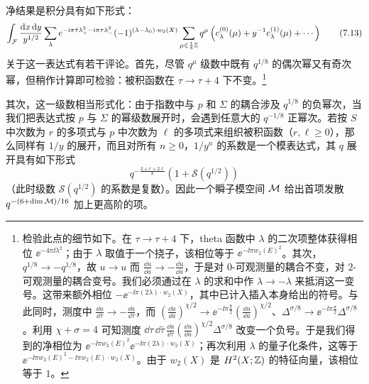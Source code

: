\begin{enumerate}
净结果是积分具有如下形式：
\begin{equation}
\int_{\mathcal{F}}\frac{\mathrm{d} x\,\mathrm{d} y}{y^{1/2}}
\sum_{\lambda}
e^{-\mathrm{i}\pi\bar\tau\lambda_+^{2}-\mathrm{i}\pi\tau\lambda_-^{2}}
(-1)^{(\lambda-\lambda_0)\cdot w_2(X)}
\sum_{\mu\in\frac{1}{8}\mathbb{Z}}
q^{\mu}\left(c_{\lambda}^{(0)}(\mu)+y^{-1}c_{\lambda}^{(1)}(\mu)+\cdots\right)
\tag{7.13}
\end{equation}
关于这一表达式有若干评论。首先，尽管 $q^{\mu}$ 级数中既有 $q^{1/8}$ 的偶次幂又有奇次幂，但稍作计算即可检验：被积函数在 $\tau\to\tau+4$ 下不变。\footnote{检验此点的细节如下。在 $\tau\to\tau+4$ 下，theta 函数中 $\lambda$ 的二次项整体获得相位 $\ee^{-4\pi\ii\lambda^{2}}$；由于 $\lambda$ 取值于一个挠子，该相位等于 $\ee^{-\ii\pi w_2(E)^{2}}$。其次，$q^{1/8}\to-q^{1/8}$，故 $u\to u$ 而 $\frac{\dd u}{\dd a}\to-\frac{\dd u}{\dd a}$，于是对 $0$-可观测量的耦合不变，对 $2$-可观测量的耦合变号。我们必须通过在 $\lambda$ 的求和中作 $\lambda\to-\lambda$ 来抵消这一变号。这带来额外相位 $-\ee^{-\ii\pi(2\lambda)\cdot w_2(X)}$，其中已计入插入本身给出的符号。与此同时，测度中 $\frac{\dd a}{\dd\tau}\to-\frac{\dd a}{\dd\tau}$，而 $\left(\frac{\dd u}{\dd a}\right)^{\chi/2}\to\ee^{-\ii\pi\frac{\chi}{2}}\left(\frac{\dd u}{\dd a}\right)^{\chi/2}$、$\Delta^{\sigma/8}\to\ee^{-\ii\pi\frac{\sigma}{2}}\Delta^{\sigma/8}$。利用 $\chi+\sigma=4$ 可知测度 $\dd\tau\,\dd\bar\tau\,\frac{\dd a}{\dd\tau}\left(\frac{\dd u}{\dd a}\right)^{\chi/2}\Delta^{\sigma/8}$ 改变一个负号。于是我们得到的净相位为 $\ee^{-\ii\pi w_2(E)^{2}}\ee^{-\ii\pi(2\lambda)\cdot w_2(X)}$；再次利用 $\lambda$ 的量子化条件，这等于 $\ee^{-\ii\pi w_2(E)^{2}-\ii\pi w_2(E)\cdot w_2(X)}$。由于 $w_2(X)$ 是 $H^{2}(X;\mathbb{Z})$ 的特征向量，该相位等于 $1$。}

其次，这一级数相当形式化：由于指数中与 $p$ 和 $\Sigma$ 的耦合涉及 $q^{1/8}$ 的负幂次，当我们把表达式按 $p$ 与 $\Sigma$ 的幂级数展开时，会遇到任意大的 $q^{-1/8}$ 正幂次。若按 $S$ 中次数为 $r$ 的多项式与 $p$ 中次数为 $\ell$ 的多项式来组织被积函数（$r,\ell\ge0$），那么同样有 $1/y$ 的展开，而且对所有 $n\ge0$，$1/y^{n}$ 的系数是一个模表达式，其 $q$ 展开具有如下形式
\begin{equation}
q^{-\frac{3+r+2\ell}{8}}\left(1+\mathcal{S}(q^{1/2})\right)
\tag{7.14}
\end{equation}
（此时级数 $\mathcal{S}(q^{1/2})$ 的系数是复数）。因此一个瞬子模空间 $\mathcal{M}$ 给出首项发散 $q^{-(6+\dim\mathcal{M})/16}$ 加上更高阶的项。


\end{enumerate}
